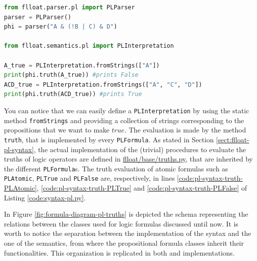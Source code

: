 \begin{lstlisting}[language=Python, style=Python, escapechar = £, label={code:pl-semantics-example}, caption={An example for \PL formula truth evaluation}]
from flloat.parser.pl import PLParser
parser = PLParser()
phi = parser("A & (!B | C) & D")

from flloat.semantics.pl import PLInterpretation

A_true = PLInterpretation.fromStrings(["A"])
print(phi.truth(A_true)) #prints False
ACD_true = PLInterpretation.fromStrings(["A", "C", "D"])
print(phi.truth(ACD_true)) #prints True
\end{lstlisting}

You can notice that we can easily define a \texttt{PLInterpretation} by using the static method \texttt{fromStrings} and providing a collection of strings corresponding to the propositions that we want to make $true$. The evaluation is made by the method \texttt{truth}, that is implemented by every \texttt{PLFormula}. As stated in Section \ref{sect:flloat-pl-syntax}, the actual implementation of the (trivial) procedures to evaluate the truths of logic operators are defined in \href{https://github.com/MarcoFavorito/flloat/blob/0.1.4/flloat/base/truths.py}{flloat/base/truths.py}, that are inherited by the different \texttt{PLFormula}s. The truth evaluation of atomic formulas such as \texttt{PLAtomic}, \texttt{PLTrue} and \texttt{PLFalse} are, respectively, in lines \ref{code:pl-syntax-truth-PLAtomic}, \ref{code:pl-syntax-truth-PLTrue} and \ref{code:pl-syntax-truth-PLFalse} of Listing \ref{code:syntax-pl.py}.

In Figure \ref{fig:formula-diagram-pl-truths} is depicted the schema representing the relations between the classes used for logic formulas discussed until now. It is worth to notice the separation between the implementation of the syntax and the one of the semantics, from where the propositional formula classes inherit their functionalities. This organization is replicated in both \LTLf and \LDLf implementations.

